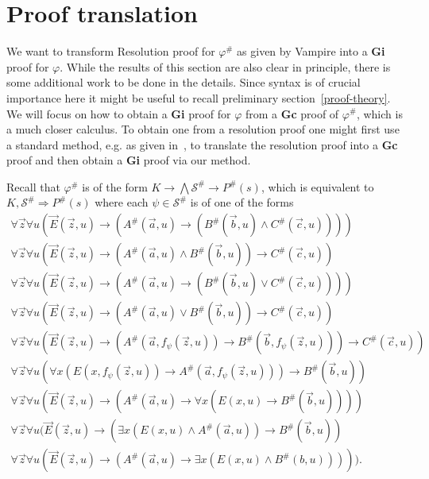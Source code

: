 \documentclass[a4paper,11pt]{report}
\theoremstyle{definition}
\theoremstyle{definition}
\theoremstyle{definition}
\theoremstyle{definition}
\theoremstyle{definition}
\theoremstyle{definition}
\theoremstyle{definition}
\begin{document}
	\section{Proof translation}
	
	
	We want to transform Resolution proof for $\varphi^\#$ as given by Vampire into a \textbf{Gi} proof for $\varphi$. While the results of this section are also clear in principle, there is some additional work to be done in the details. Since syntax is of crucial importance here it might be useful to recall preliminary section~\ref{proof-theory}. We will focus on how to obtain a \textbf{Gi} proof for $\varphi$ from a \textbf{Gc} proof of $\varphi^\#$, which is a much closer calculus. To obtain one from a resolution proof one might first use a standard method, e.g. as given in~\cite{de2005translation}, to translate the resolution proof into a \textbf{Gc} proof and then obtain a \textbf{Gi} proof via our method.
	
	Recall that $\varphi^\#$ is of the form $K\to \bigwedge\mathcal S^\#\to P^\#(s)$, which is equivalent to $K,\mathcal S^\#\Rightarrow P^\#(s)$ where each $\psi\in\mathcal S^\#$ is of one of the forms
	\[\begin{matrix}
		\forall \vec z\forall u(\vec E(\vec z, u)\to (A^\#(\vec a, u)\to (B^\#(\vec b, u)\wedge C^\#(\vec c, u))))\\\forall \vec z\forall u(\vec E(\vec z, u)\to (A^\#(\vec a, u)\wedge B^\#(\vec b, u))\to C^\#(\vec c, u))\\ \forall \vec z\forall u(\vec E(\vec z, u)\to (A^\#(\vec a, u)\to (B^\#(\vec b, u)\vee C^\#(\vec c, u))))\\
		\forall \vec z\forall u(\vec E(\vec z, u)\to (A^\#(\vec a, u)\vee B^\#(\vec b, u))\to C^\#(\vec c, u))\\ \forall \vec z\forall u(\vec E(\vec z, u)\to (A^\#(\vec a, f_\psi(\vec z, u))\to B^\#(\vec b, f_\psi(\vec z, u)))\to C^\#(\vec c, u))\\\forall \vec z\forall u(\forall x(E(x, f_\psi(\vec z, u))\to A^\#(\vec a, f_\psi(\vec z, u)))\to B^\#(\vec b, u))\\ \forall \vec z\forall u(\vec E(\vec z, u)\to (A^\#(\vec a, u)\to\forall x(E(x, u)\to B^\#(\vec b, u))))\\ \forall \vec z\forall u(\vec E(\vec z, u)\to (\exists x(E(x, u) \wedge A^\#(\vec a, u))\to B^\#(\vec b, u))\\\forall \vec z\forall u(\vec E(\vec z, u)\to (A^\#(\vec a, u)\to\exists x(E(x, u) \wedge B^\#(b, u))))).
	\end{matrix}\]
\end{document}
